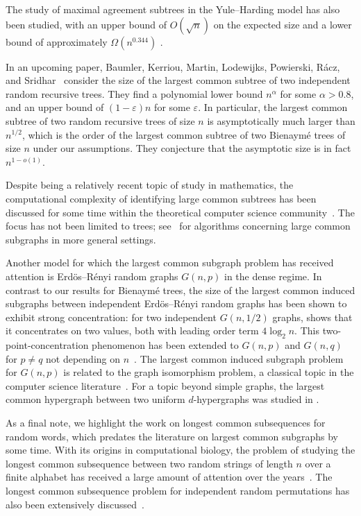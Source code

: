 \documentclass[11pt,reqno]{amsart}
\newcommand{\eps}{\varepsilon}
\begin{document}
\smallskip
The study of maximal agreement subtrees in the Yule--Harding model has also been studied, with an upper bound of $O(\sqrt{n})$ on the expected size and a lower bound of approximately $\Omega(n^{0.344})$ \cite{david2003size,bernstein2015bounds}.
\smallskip

In an upcoming paper, Baumler, Kerriou, Martin, Lodewijks, Powierski, R\'acz, and Sridhar~\cite{RRT-LCS} consider the size of the largest common subtree of two independent random recursive trees. 
They find a polynomial lower bound $n^\alpha$ for some $\alpha>0.8$, and an upper bound of $(1-\eps)n$ for some $\eps$. In particular, the largest common subtree of two random recursive trees of size $n$ is asymptotically much larger than $n^{1/2}$, which is the order of the largest common subtree of two Bienaymé trees of size $n$ under our assumptions. They conjecture that the asymptotic size is in fact $n^{1-o(1)}$.
\smallskip

Despite being a relatively recent topic of study in mathematics, the computational complexity of identifying large common subtrees has been discussed for some time within the theoretical computer science community~\cite{akutsu1992RNC,shamir1999faster}. The focus has not been limited to trees; see~\cite{ehrlich2011maximum} for algorithms concerning large common subgraphs in more general settings.
\smallskip

Another model for which the largest common subgraph problem has received attention is Erd\"{o}s--R\'{e}nyi random graphs $G(n,p)$ in the dense regime. In contrast to our results for Bienaym\'{e} trees, the size of the largest common induced subgraphs between independent Erd\"{o}s--R\'{e}nyi random graphs has been shown to exhibit strong concentration: for two independent $G(n,1/2)$ graphs, \cite{chatterjee2023isomorphisms} shows that it concentrates on two values, both with leading order term $4 \log_2 n$. This two-point-concentration phenomenon has been extended to $G(n,p)$ and $G(n,q)$ for $p \ne q$  not depending on $n$~\cite{diamantidis2024combinatorial,surya2025isomorphisms}. The largest common induced subgraph problem for $G(n,p)$ is related to the graph isomorphism problem, a classical topic in the computer science literature~\cite{mccreesh2018subgraph}. For a topic beyond simple graphs, the largest common hypergraph between two uniform $d$-hypergraphs was studied in \cite{lenoir2024isomorphisms}.
\smallskip

As a final note, we highlight the work on longest common subsequences for random words, which predates the literature on largest common subgraphs by some time. With its origins in computational biology, the problem of studying the longest common subsequence between two random strings of length $n$ over a finite alphabet has received a large amount of attention over the years~\cite{Chvatal1975,Danvcik1995,Deken1979,Houdre2023,kiwi2005expected,Lueker2009}. The longest common subsequence problem for independent random permutations has also been extensively discussed~\cite{Romik_mono,Jin2019}.
\end{document}
